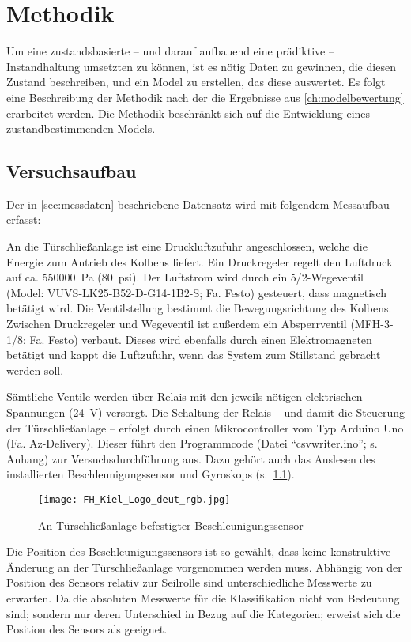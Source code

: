 \chapter{Methodik}
\label{ch:methodik}
Um eine zustandsbasierte -- und darauf aufbauend eine prädiktive -- Instandhaltung umsetzten zu können, ist es nötig Daten zu gewinnen, die diesen Zustand beschreiben, und ein Model zu erstellen, das diese auswertet. Es folgt eine Beschreibung der Methodik nach der die Ergebnisse aus \cref{ch:modelbewertung} erarbeitet werden. Die Methodik beschränkt sich auf die Entwicklung eines zustandbestimmenden Models.
\section{Versuchsaufbau}
\label{sec:versuchsaufbau}
Der in \cref{sec:messdaten} beschriebene Datensatz wird mit folgendem Messaufbau erfasst:

An die Türschließanlage ist eine Druckluftzufuhr angeschlossen, welche die Energie zum Antrieb des Kolbens liefert. Ein Druckregeler regelt den Luftdruck auf ca. \SI{550000}{\pascal} (\SI{80}{psi}). Der Luftstrom wird durch ein 5/2-Wegeventil (Model: VUVS-LK25-B52-D-G14-1B2-S; Fa. Festo) gesteuert, dass magnetisch betätigt wird. Die Ventilstellung bestimmt die Bewegungsrichtung des Kolbens. Zwischen Druckregeler und Wegeventil ist außerdem ein Absperrventil (MFH-3-1/8; Fa. Festo) verbaut. Dieses wird ebenfalls durch einen Elektromagneten betätigt und kappt die Luftzufuhr, wenn das System zum Stillstand gebracht werden soll.

Sämtliche Ventile werden über Relais mit den jeweils nötigen elektrischen Spannungen (\SI{24}{\volt}) versorgt. Die Schaltung der Relais -- und damit die Steuerung der Türschließanlage -- erfolgt durch einen Mikrocontroller vom Typ Arduino Uno (Fa. Az-Delivery). Dieser führt den Programmcode (Datei \enquote{csvwriter.ino}; s. Anhang) zur Versuchsdurchführung aus.  Dazu gehört auch das Auslesen des installierten Beschleunigungssensor und Gyroskops (s.~\cref{fig:beschleunigungssensor}). 

\begin{figure}[ht]
	\centering
	\texttt{[image: FH\_Kiel\_Logo\_deut\_rgb.jpg]}
	\caption{An Türschließanlage befestigter Beschleunigungssensor}
	\label{fig:beschleunigungssensor}
\end{figure}

Die Position des Beschleunigungssensors ist so gewählt, dass keine konstruktive Änderung an der Türschließanlage vorgenommen werden muss. Abhängig von der Position des Sensors relativ zur Seilrolle sind unterschiedliche Messwerte zu erwarten. Da die absoluten Messwerte für die Klassifikation nicht von Bedeutung sind; sondern nur deren Unterschied in Bezug auf die Kategorien; erweist sich die Position des Sensors als geeignet.

